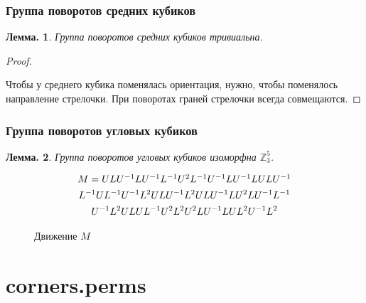 \documentclass[utf8,russian]{beamer}
\newtheorem{ru_theo}{Лемма.}
\renewenvironment{theorem}{\begin{ru_theo}}{\end{ru_theo}}
\begin{document}

\begin{frame}
\frametitle{Группа поворотов средних кубиков}
\begin{theorem}
Группа поворотов средних кубиков тривиальна.
\end{theorem}
\begin{proof}
	\RubikCubeSolved
	\begin{figure}
	\end{figure}
	Чтобы у среднего кубика поменялась ориентация, нужно, чтобы поменялось направление стрелочки. При поворотах граней стрелочки всегда совмещаются.
\end{proof}
\end{frame}


\begin{frame}
\frametitle{Группа поворотов угловых кубиков}
\begin{theorem}
Группа поворотов угловых кубиков изоморфна $\mathbb{Z}_3^5$.
\end{theorem}
\begin{multline*}
$$
M = ULU^{-1}LU^{-1}L^{-1}U^2L^{-1}U^{-1}LU^{-1}LULU^{-1}       \\
L^{-1}UL^{-1}U^{-1}L^2ULU^{-1}L^2ULU^{-1}LU^2LU^{-1}L^{-1} \\
U^{-1}L^2ULUL^{-1}U^2L^2U^2LU^{-1}LUL^2U^{-1}L^2
$$
\end{multline*}
\begin{figure}
	\RubikCubeSolved
	\caption{Движение $M$}
\end{figure}
\end{frame}

\section{corners.perms}
\end{document}
